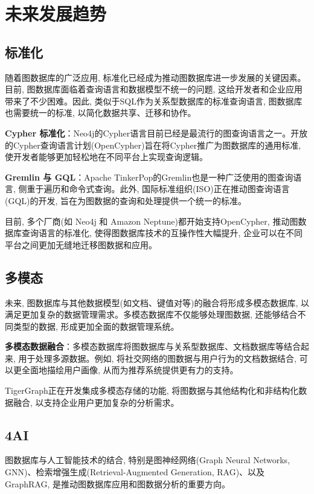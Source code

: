 \section{未来发展趋势}

\subsection{标准化}
随着图数据库的广泛应用, 标准化已经成为推动图数据库进一步发展的关键因素。目前, 图数据库面临着查询语言和数据模型不统一的问题, 这给开发者和企业应用带来了不少困难。因此, 类似于SQL作为关系型数据库的标准查询语言, 图数据库也需要统一的标准, 以简化数据共享、迁移和协作。

\textbf{Cypher 标准化}：Neo4j的Cypher语言目前已经是最流行的图查询语言之一。开放的Cypher查询语言计划(OpenCypher)旨在将Cypher推广为图数据库的通用标准, 使开发者能够更加轻松地在不同平台上实现查询逻辑。

\textbf{Gremlin 与 GQL}：Apache TinkerPop的Gremlin也是一种广泛使用的图查询语言, 侧重于遍历和命令式查询。此外, 国际标准组织(ISO)正在推动图查询语言(GQL)的开发, 旨在为图数据的查询和处理提供一个统一的标准。

目前, 多个厂商(如 Neo4j 和 Amazon Neptune)都开始支持OpenCypher, 推动图数据库查询语言的标准化, 使得图数据库技术的互操作性大幅提升, 企业可以在不同平台之间更加无缝地迁移图数据和应用。

\subsection{多模态}
未来, 图数据库与其他数据模型(如文档、键值对等)的融合将形成多模态数据库, 以满足更加复杂的数据管理需求。多模态数据库不仅能够处理图数据, 还能够结合不同类型的数据, 形成更加全面的数据管理系统。

\textbf{多模态数据融合}：多模态数据库将图数据库与关系型数据库、文档数据库等结合起来, 用于处理多源数据。例如, 将社交网络的图数据与用户行为的文档数据结合, 可以更全面地描绘用户画像, 从而为推荐系统提供更有力的支持\cite{han2021multimodal}。

TigerGraph正在开发集成多模态存储的功能, 将图数据与其他结构化和非结构化数据融合, 以支持企业用户更加复杂的分析需求。


\subsection{4AI}
图数据库与人工智能技术的结合, 特别是图神经网络(Graph Neural Networks, GNN)、检索增强生成(Retrieval-Augmented Generation, RAG)、以及 GraphRAG, 是推动图数据库应用和图数据分析的重要方向。

